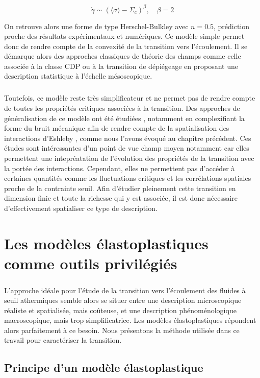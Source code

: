 \begin{equation}
	\dot{\gamma} \sim (\langle \sigma \rangle - \Sigma_c)^\beta, \quad \beta = 2
\end{equation}

\noindent On retrouve alors une forme de type Herschel-Bulkley avec $n=0.5$, prédiction proche des résultats expérimentaux et numériques. Ce modèle simple permet donc de rendre compte de la convexité de la transition vers l'écoulement. Il se démarque alors des approches classiques de théorie des champs comme celle associée à la classe CDP ou à la transition de dépiégeage en proposant une description statistique à l'échelle mésoscopique. 

\subparagraph{}Toutefois, ce modèle reste très simplificateur et ne permet pas de rendre compte de toutes les propriétés critiques associées à la transition. Des approches de généralisation de ce modèle ont été étudiées \cite{agoritsas_relevance_2015, bouchaud_spontaneous_2016}, notamment en complexifiant la forme du bruit mécanique afin de rendre compte de la spatialisation des interactions d'Eshleby \cite{lin_mean-field_2016, lin_microscopic_2018}, comme nous l'avons évoqué au chapitre précédent. Ces études sont intéressantes d'un point de vue champ moyen notamment car elles permettent une intepréatation de l'évolution des propriétés de la transition avec la portée des interactions. Cependant, elles ne permettent pas d'accéder à certaines quantités comme les fluctuations critiques et les corrélations spatiales proche de la contrainte seuil. Afin d'étudier pleinement cette transition en dimension finie et toute la richesse qui y est associée, il est donc nécessaire d'effectivement spatialiser ce type de description. 

\section{Les modèles élastoplastiques comme outils privilégiés}

\subparagraph{}L'approche idéale pour l'étude de la transition vers l'écoulement des fluides à seuil athermiques semble alors se situer entre une description microscopique réaliste et spatialisée, mais coûteuse, et une description phénoménologique macroscopique, mais trop simplificatrice. Les modèles élastoplastiques répondent alors parfaitement à ce besoin. Nous présentons la méthode utilisée dans ce travail pour caractériser la transition.

\subsection{Principe d'un modèle élastoplastique}

